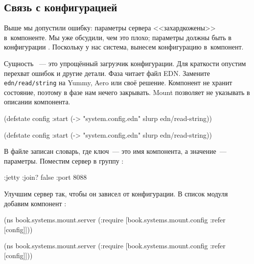 \subsection{Связь с конфигурацией}

Выше мы допустили ошибку: параметры сервера <<захардкожены>> в~компоненте. Мы
уже обсудили, чем это плохо; параметры должны быть в
конфигурации . Поскольку у нас система, вынесем конфигурацию
в~компонент.


Сущность ~--- это упрощённый загрузчик конфигурации. Для краткости
опустим перехват ошибок и другие детали. Фаза  читает файл
EDN. Замените \texttt{edn/read\-/string} на Yummy, Aero или своё
решение. Компонент не хранит состояние, поэтому в фазе  нам нечего
закрывать. Mount позволяет не указывать  в описании компонента.

\ifnarrow

\begin{clojure}
(defstate config
  :start
  (-> "system.config.edn"
      slurp
      edn/read-string))
\end{clojure}

\else

\begin{clojure}
(defstate config
  :start
  (-> "system.config.edn" slurp edn/read-string))
\end{clojure}

\fi

В файле  записан словарь, где ключ~--- это имя компонента, а
значение~--- параметры. Поместим сервер в группу :

\begin{clojure}
{:jetty {:join? false :port 8088}}
\end{clojure}


Улучшим сервер так, чтобы он зависел от конфигурации. В список 
модуля добавим компонент :

\ifnarrow

\begin{clojure}
(ns book.systems.mount.server
 (:require
  [book.systems.mount.config
   :refer [config]]))
\end{clojure}

\else

\begin{clojure}
(ns book.systems.mount.server
 (:require
  [book.systems.mount.config :refer [config]]))
\end{clojure}

